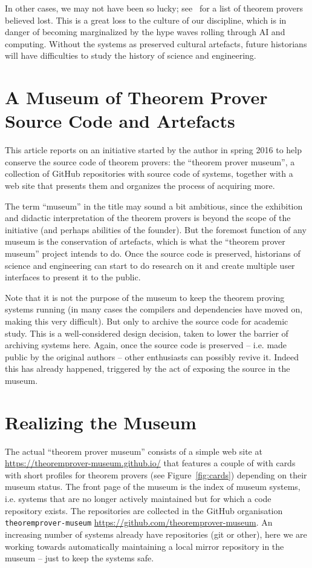 \documentclass{article}
\begin{document}
In other cases, we may not have been so lucky; see~\cite{tpmuseum:tpbl:on} for a list of
theorem provers believed lost. This is a great loss to the culture of our discipline,
which is in danger of becoming marginalized by the hype waves rolling through AI and
computing. Without the systems as preserved cultural artefacts, future historians will
have difficulties to study the history of science and engineering.

\section{A Museum of Theorem Prover Source Code and Artefacts}

This article reports on an initiative started by the author in spring 2016 to help
conserve the source code of theorem provers: the ``theorem prover museum'', a collection
of GitHub repositories with source code of systems, together with a web site that presents
them and organizes the process of acquiring more.

The term ``museum'' in the title may sound a bit ambitious, since the exhibition and
didactic interpretation of the theorem provers is beyond the scope of the initiative (and
perhaps abilities of the founder). But the foremost function of any museum is the
conservation of artefacts, which is what the ``theorem prover museum'' project intends to
do. Once the source code is preserved, historians of science and engineering can start to
do research on it and create multiple user interfaces to present it to the public.

Note that it is not the purpose of the museum to keep the theorem proving systems running
(in many cases the compilers and dependencies have moved on, making this very
difficult). But only to archive the source code for academic study.  This is a
well-considered design decision, taken to lower the barrier of archiving systems
here. Again, once the source code is preserved -- i.e. made public by the original authors
-- other enthusiasts can possibly revive it. Indeed this has already happened, triggered
by the act of exposing the source in the museum.

\section{Realizing the Museum}

The actual ``theorem prover museum'' consists of a simple web site at
\url{https://theoremprover-museum.github.io/} that features a couple of with cards with
short profiles for theorem provers (see Figure~\ref{fig:cards}) depending on their museum
status. The front page of the museum is the index of museum systems, i.e. systems that are
no longer actively maintained but for which a code repository exists. The repositories are
collected in the GitHub organisation \texttt{theoremprover-museum}
\url{https://github.com/theoremprover-museum}. An increasing number of systems already
have repositories (git or other), here we are working towards automatically maintaining a
local mirror repository in the museum -- just to keep the systems safe. 
\end{document}
